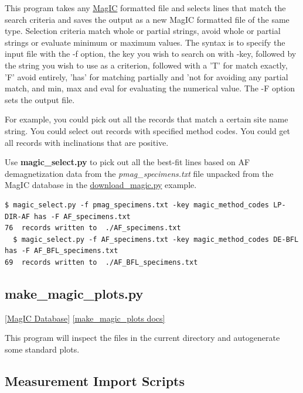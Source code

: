 \documentclass[11pt]{book}
\begin{document}
{{{{This program takes any \href{#MagIC}{MagIC} formatted file and selects lines that match the search criteria and saves the output as a new MagIC formatted file of the same type.  Selection criteria match whole or partial strings, avoid whole or partial strings or evaluate minimum or maximum values.    The syntax is to specify the input file with the -f option, the key you wish to search on with -key, followed by the string you wish to use as a criterion, followed with a 'T' for match exactly, 'F' avoid entirely, 'has' for matching partially and 'not for avoiding any partial match, and min, max and eval for evaluating the numerical value.  The -F option sets the output file.

  For example, you could pick out all the records that match a certain site name string.  You could select out records with specified method codes.  You could get all records with inclinations that are positive.

  Use {\bf magic\_select.py} to pick out all the best-fit lines based on AF demagnetization data from the {\it pmag\_specimens.txt} file unpacked from the MagIC database in the \href{#download_magic.py}{download\_magic.py} example.

  \begin{verbatim}
$ magic_select.py -f pmag_specimens.txt -key magic_method_codes LP-DIR-AF has -F AF_specimens.txt
76  records written to  ./AF_specimens.txt
  $ magic_select.py -f AF_specimens.txt -key magic_method_codes DE-BFL has -F AF_BFL_specimens.txt
69  records written to  ./AF_BFL_specimens.txt

 \end{verbatim}

\subsection{make\_magic\_plots.py}
\href{#MagICDatabase}{[MagIC Database]}
\href{https://github.com/PmagPy/PmagPy/blob/master/programs/make_magic_plots.py}{[make\_magic\_plots docs]}

This program will inspect the files in the current directory and autogenerate some standard plots.

\subsection{Measurement Import Scripts}


}}}}
\end{document}

